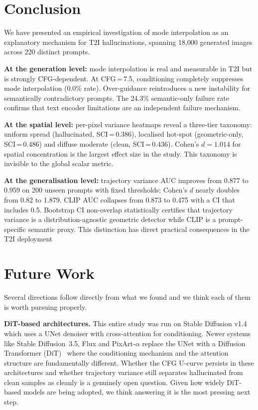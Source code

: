 \documentclass[conference]{IEEEtran}
\begin{document}
\section{Conclusion}
\label{sec:conclusion}

We have presented an empirical investigation of mode interpolation
as an explanatory mechanism for T2I hallucinations, spanning 18{,}000
generated images across 220 distinct prompts.

\textbf{At the generation level:} mode interpolation is real and
measurable in T2I but is strongly CFG-dependent. At CFG\,=\,7.5,
conditioning completely suppresses mode interpolation (0.0\% rate).
Over-guidance reintroduces a new instability for semantically
contradictory prompts. The 24.3\% semantic-only failure rate confirms
that text encoder limitations are an independent failure mechanism.

\textbf{At the spatial level:} per-pixel variance heatmaps reveal
a three-tier taxonomy: uniform spread (hallucinated, SCI\,=\,0.386),
localised hot-spot (geometric-only, SCI\,=\,0.486) and diffuse
moderate (clean, SCI\,=\,0.436). Cohen's $d{=}1.014$ for spatial
concentration is the largest effect size in the study. This taxonomy
is invisible to the global scalar metric.

\textbf{At the generalisation level:} trajectory variance AUC
improves from 0.877 to 0.959 on 200 unseen prompts with fixed
thresholds; Cohen's $d$ nearly doubles from 0.82 to 1.879. CLIP
AUC collapses from 0.873 to 0.475 with a CI that includes 0.5.
Bootstrap CI non-overlap statistically certifies that trajectory
variance is a distribution-agnostic geometric detector while CLIP
is a prompt-specific semantic proxy. This
distinction has direct practical consequences in the T2I deployment


\section{Future Work}
\label{sec:futurework}

Several directions follow directly from what we found and we think
each of them is worth pursuing properly.

\textbf{DiT-based architectures.}
This entire study was run on Stable Diffusion v1.4 which uses a
UNet denoiser with cross-attention for conditioning. Newer systems
like Stable Diffusion~3.5, Flux and PixArt-$\alpha$ replace the UNet
with a Diffusion Transformer (DiT)~\cite{rombach2022ldm,
ramesh2022dalle2} where the conditioning mechanism and the attention
structure are fundamentally different. Whether the CFG U-curve
persists in these architectures and whether trajectory variance
still separates hallucinated from clean samples as cleanly is a
genuinely open question. Given how widely DiT-based models are
being adopted, we think answering it is the most pressing next step.
\end{document}
